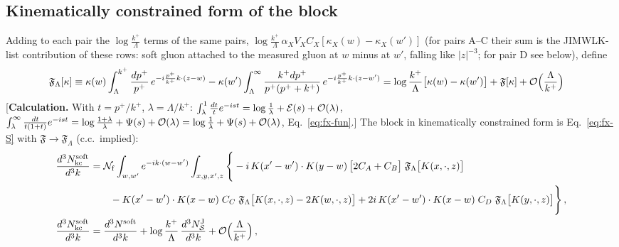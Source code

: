 {\subsection*{Kinematically constrained form of the block}
 Adding to each pair the $\log\frac{k^{+}}{\Lambda}$ terms of the same pairs, $\log\frac{k^{+}}{\Lambda}\,\alpha_{X}V_{X}C_{X}[\kappa_{X}(w)-\kappa_{X}(w')]$ (for pairs A--C their sum is the JIMWLK-list contribution of these rows: soft gluon attached to the measured gluon at $w$ minus at $w'$, falling like $|z|^{-3}$; for pair D see below), define
\begin{align}
\mathfrak{F}_{\Lambda}[\kappa]&\equiv\kappa(w)\int_{\Lambda}^{k^{+}}\frac{dp^{+}}{p^{+}}\,e^{-i\frac{p^{+}}{k^{+}}k\cdot(z-w)}-\kappa(w')\int_{\Lambda}^{\infty}\frac{k^{+}dp^{+}}{p^{+}(p^{+}+k^{+})}\,e^{-i\frac{p^{+}}{k^{+}}k\cdot(z-w')}
=\log\frac{k^{+}}{\Lambda}\big[\kappa(w)-\kappa(w')\big]+\mathfrak{F}[\kappa]+{\cal O}\Big(\frac{\Lambda}{k^{+}}\Big)\label{eq:fx-FLam}
\end{align}
[\textbf{Calculation.} With $t=p^{+}/k^{+}$, $\lambda=\Lambda/k^{+}$: $\int_{\lambda}^{1}\frac{dt}{t}e^{-ist}=\log\frac{1}{\lambda}+\mathcal{E}(s)+{\cal O}(\lambda)$, $\int_{\lambda}^{\infty}\frac{dt}{t(1+t)}e^{-ist}=\log\frac{1+\lambda}{\lambda}+\Psi(s)+{\cal O}(\lambda)=\log\frac{1}{\lambda}+\Psi(s)+{\cal O}(\lambda)$, Eq.~\eqref{eq:fx-fun}.] The block in kinematically constrained form is Eq.~\eqref{eq:fx-S} with $\mathfrak{F}\to\mathfrak{F}_{\Lambda}$ (c.c.\ implied):
\begin{align}
\frac{d^{3}N^{\rm soft}_{\rm kc}}{d^{3}k}&=\mathcal{N}_{\rm f}\int_{w,w'}e^{-ik\cdot(w-w')}\int_{x,y,x',z}\Bigg\{-i\,K(x'-w')\cdot K(y-w)\,\big[2C_{A}+C_{B}\big]\;\mathfrak{F}_{\Lambda}\big[K(x,\cdot,z)\big]\notag\\
&\qquad-K(x'-w')\cdot K(x-w)\;C_{C}\;\mathfrak{F}_{\Lambda}\big[K(x,\cdot,z)-2K(w,\cdot,z)\big]+2i\,K(x'-w')\cdot K(x-w)\;C_{D}\;\mathfrak{F}_{\Lambda}\big[K(y,\cdot,z)\big]\Bigg\}\,,\label{eq:fx-Skc}\\
\frac{d^{3}N^{\rm soft}_{\rm kc}}{d^{3}k}&=\frac{d^{3}N^{\rm soft}}{d^{3}k}+\log\frac{k^{+}}{\Lambda}\,\frac{d^{3}N^{\rm J}_{\mathcal{S}}}{d^{3}k}+{\cal O}\Big(\frac{\Lambda}{k^{+}}\Big)\,,\label{eq:fx-kcequiv}
\end{align}
}
